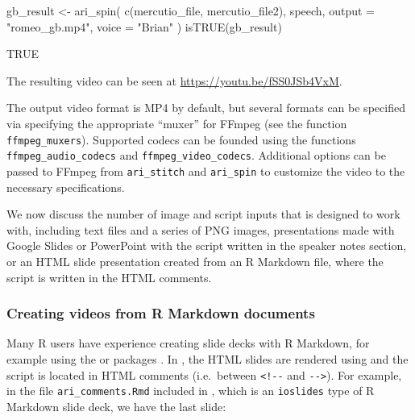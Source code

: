 \begin{example}
gb_result <- ari_spin(
  c(mercutio_file, mercutio_file2),
  speech,
  output = "romeo_gb.mp4", voice = "Brian"
)
isTRUE(gb_result)
\end{example}

\begin{example}
[1] TRUE
\end{example}

The resulting video can be seen at \url{https://youtu.be/fSS0JSb4VxM}.

The output video format is MP4 by default, but several formats can be
specified via specifying the appropriate ``muxer'' for FFmpeg (see the
function \texttt{ffmpeg\_muxers}). Supported codecs can be founded using
the functions \texttt{ffmpeg\_audio\_codecs} and
\texttt{ffmpeg\_video\_codecs}. Additional options can be passed to
FFmpeg from \texttt{ari\_stitch} and \texttt{ari\_spin} to customize the
video to the necessary specifications.

We now discuss the number of image and script inputs that  is
designed to work with, including text files and a series of PNG images,
presentations made with Google Slides or PowerPoint with the script
written in the speaker notes section, or an HTML slide presentation
created from an R Markdown file, where the script is written in the HTML
comments.

\hypertarget{creating-videos-from-r-markdown-documents}{%
\subsubsection{Creating videos from R Markdown
documents}\label{creating-videos-from-r-markdown-documents}}

Many R users have experience creating slide decks with R Markdown, for
example using the  or  packages
\citep{rmarkdown, rmarkdownbook, xaringan}. In , the HTML
slides are rendered using  \citep{webshot} and the
script is located in HTML comments (i.e.~between
\texttt{\textless{}!-\/-} and \texttt{-\/-\textgreater{}}). For example,
in the file \texttt{ari\_comments.Rmd} included in , which is
an \texttt{ioslides} type of R Markdown slide deck, we have the last
slide:


